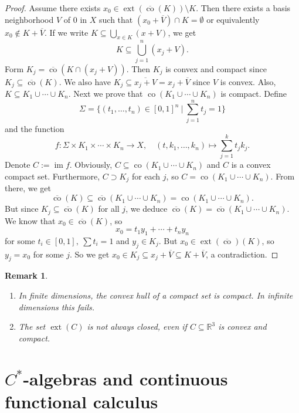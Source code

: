 \documentclass[10pt, a4paper]{article}
\newtheorem*{remark}{Remark}
\newenvironment{noticeC}{%
  \tcolorbox[%
  notitle,
  empty,
  enhanced,  %
  breakable,
  coltext=black, 
  fontupper=\rmfamily,
  noparskip,
  sharp corners,
  boxrule=-1pt,  %
  frame hidden,
  left=7pt,  %
  right=7pt,
  top=5pt,
  bottom=5pt,
  before skip=2.5ex plus 2pt,
  after skip=2.5ex plus 2pt,
  overlay unbroken and last={%
  },
  ]}
{\endtcolorbox}
\newenvironment{myproof}%
  {\begin{noticeC}\begin{proof}}%
  {\end{proof}\end{noticeC}}
\newcommand{\R}{\mathbb {R}}
\DeclareMathOperator{\im}{im}
\DeclareMathOperator{\ext}{ext}
\DeclareMathOperator{\co}{co}
\begin{document}
\begin{myproof}
  Assume there exists $x_0 \in \ext (\overline{\co} (K)) \setminus K$.
  Then there exists a basis neighborhood $V$ of $0$ in $X$ such that 
  $(x_0 + \overline{V}) \cap K = \emptyset$ or equivalently $x_0 \notin K + \overline{V}$.
  If we write 
  $K \subseteq \bigcup_{x \in K} (x + V)$, 
  we get 
  $$K \subseteq \bigcup_{j = 1} ^{n} (x_j + V).$$
  Form $K_j = \overline{\co} (K \cap (x_j + V))$.
  Then $K_j$ is convex and compact since $K_j \subseteq \overline{\co} (K)$.
  We also have $K_j \subseteq \overline{x_j + V} = x_j + \overline{V}$ since $V$ is convex.
  Also, $K \subseteq K_1 \cup \cdots \cup K_n$.
  Next we prove that $\co (K_1 \cup \cdots \cup K_n)$ is compact.
  Define $$\Sigma = \{(t_1, \dots, t_n) \in [0, 1]^n\ |\ \sum_{j = 1} ^n t_j = 1\}$$
  and the function 
  $$f: \Sigma \times K_1 \times \cdots \times K_n \to X,\quad (t, k_1, \dots, k_n) \mapsto \sum_{j = 1} ^k t_j k_j.$$
  Denote $C := \im f$.
  Obviously, $C \subseteq \co (K_1 \cup \cdots \cup K_n)$ and $C$ is a convex compact set.
  Furthermore, $C \supset K_j$ for each $j$, so $C = \co (K_1 \cup \cdots \cup K_n)$.
  From there, we get 
  $$\overline{\co} (K) \subseteq \overline{\co} (K_1 \cup \cdots \cup K_n) = {\co} (K_1 \cup \cdots \cup K_n).$$
  But since $K_j \subseteq \overline{\co} (K)$ for all $j$, we deduce $\overline{\co} (K) = \overline{\co} (K_1 \cup \cdots \cup K_n)$.
  We know that $x_0 \in \overline{\co} (K)$, so $$x_0 = t_1 y_1 + \cdots + t_n y_n$$
  for some $t_i \in [0, 1],\ \sum t_i = 1$ and $y_j \in K_j$.
  But $x_0 \in \ext (\overline{\co})(K)$, so $y_j = x_0$ for some $j$. So we get 
  $x_0 \in K_j \subseteq x_j + \overline{V} \subseteq K + \overline{V}$,
  a contradiction.
\end{myproof}

\begin{remark}
  \begin{enumerate}
    \item In finite dimensions, the convex hull of a compact set is compact.
    In infinite dimensions this fails.
    \item The set $\ext (C)$ is not always closed, even if $C \subseteq \R^3$ is convex and compact.
  \end{enumerate}
\end{remark}

\section{$C^*$-algebras and continuous functional calculus}
\end{document}
